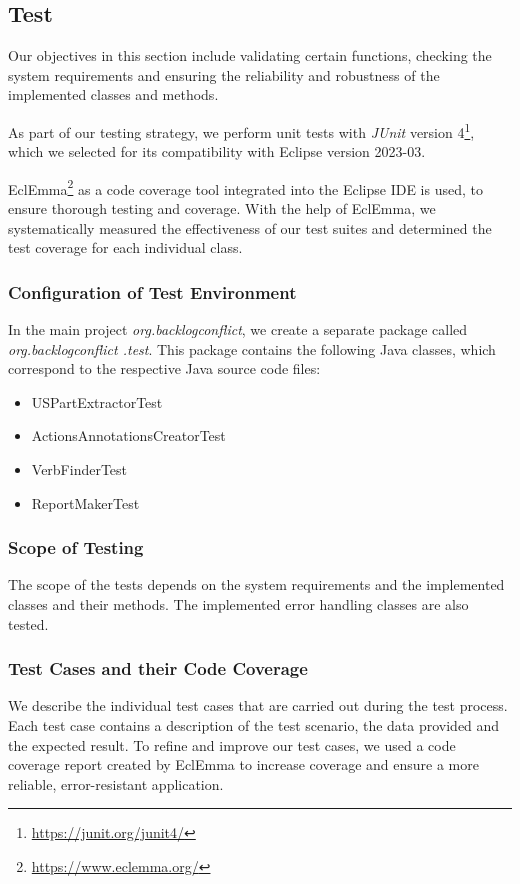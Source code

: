 \subsection{Test}\label{conflict_test}
Our objectives in this section include validating certain functions, checking the system requirements and ensuring the reliability and robustness of the implemented classes and methods.

As part of our testing strategy, we perform unit tests with \textit{JUnit} version 4\footnote{\href{https://junit.org/junit4/}{https://junit.org/junit4/}}, which we selected for its compatibility with Eclipse version 2023-03. 

EclEmma\footnote{\href{https://www.eclemma.org/}{https://www.eclemma.org/}} as a code coverage tool integrated into the Eclipse IDE is used, to ensure thorough testing and coverage. With the help of EclEmma, we systematically measured the effectiveness of our test suites and determined the test coverage for each individual class.
\subsubsection*{Configuration of Test Environment}
In the main project \textit{org.backlogconflict}, we create a separate package called \textit{org.backlogconflict .test}. This package contains the following Java classes, which correspond to the respective Java source code files:
\begin{itemize}
	
	\item USPartExtractorTest
	
	\item ActionsAnnotationsCreatorTest
	
	\item VerbFinderTest
	
	\item ReportMakerTest
	
\end{itemize}
\subsubsection*{Scope of Testing}
The scope of the tests depends on the system requirements and the implemented classes and their methods. The implemented error handling classes are also tested.
\subsubsection*{Test Cases and their Code Coverage}
We describe the individual test cases that are carried out during the test process. Each test case contains a description of the test scenario, the data provided and the expected result. To refine and improve our test cases, we used a code coverage report created by EclEmma to increase coverage and ensure a more reliable, error-resistant application.

